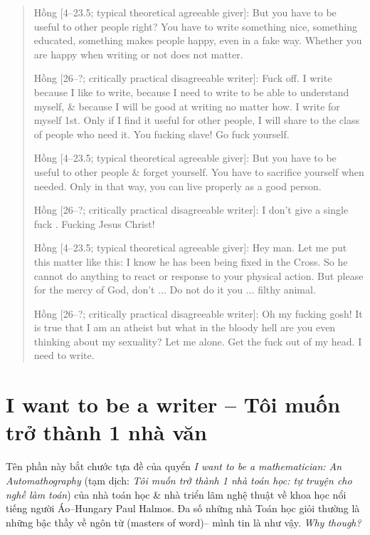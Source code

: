 \documentclass[12pt,oneside]{book}
\begin{document}
\begin{quote}
	{\sf Hồng [4--23.5; typical theoretical agreeable giver]}: But you have to be useful to other people right? You have to write something nice, something educated, something makes people happy, even in a fake way. Whether you are happy when writing or not does not matter.
	
	{\sf Hồng [26--?; critically practical disagreeable writer]}: Fuck off. I write because I like to write, because I need to write to be able to understand myself, \& because I will be good at writing no matter how. I write for myself 1st. Only if I find it useful for other people, I will share to the class of people who need it. You fucking slave! Go fuck yourself.
	
	{\sf Hồng [4--23.5; typical theoretical agreeable giver]}: But you have to be useful to other people \& forget yourself. You have to sacrifice yourself when needed. Only in that way, you can live properly as a good person.
	
	{\sf Hồng [26--?; critically practical disagreeable writer]}: I don't give a single fuck \cite{Manson_giving_fuck,Manson_giving_fuck_vn}. Fucking Jesus Christ!
	
	{\sf Hồng [4--23.5; typical theoretical agreeable giver]}: Hey man. Let me put this matter like this: I know he has been being fixed in the Cross. So he cannot do anything to react or response to your physical action. But please for the mercy of God, don't $\ldots$ Do not do it you $\ldots$ filthy animal.
	
	{\sf Hồng [26--?; critically practical disagreeable writer]}: Oh my fucking gosh! It is true that I am an atheist but what in the bloody hell are you even thinking about my sexuality? Let me alone. Get the fuck out of my head. I need to write.
\end{quote}

\section{I want to be a writer -- Tôi muốn trở thành 1 nhà văn}
\label{sect: writer wannabe}
Tên phần này bắt chước tựa đề của quyển {\it I want to be a mathematician: An Automathography} \cite{Halmos1985,Halmos1985_3_parts} (tạm dịch: {\it Tôi muốn trở thành 1 nhà toán học: tự truyện cho nghề làm toán}) của nhà toán học \& nhà triển lãm nghệ thuật về khoa học nổi tiếng người Áo--Hungary {\sc Paul Halmos}. Đa số những nhà Toán học giỏi thường là những bậc thầy về ngôn từ (masters of word)-- mình tin là như vậy. {\it Why though?}
\end{document}

